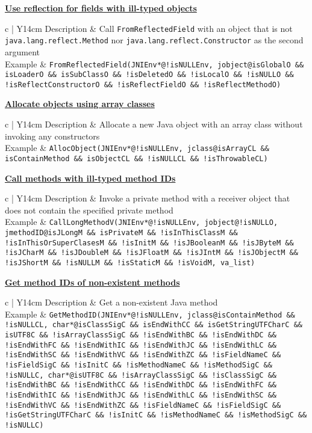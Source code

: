 \documentclass[10pt]{article}
\newcommand{\tc}[1]{\noindent\textbf{\underline{#1}}}
\newcommand{\mytable}[1]{{\renewcommand{\arraystretch}{2.0}
      \begin{tabular}{ c | Y{14cm}} #1
    \end{tabular}}\hfill}
\newcommand{\tctable}[4]{\mytable{#1 & #2 \\\hline #3 & \texttt{#4} \\}}
\begin{document}
\vspace{3mm}
\tc{Use reflection for fields with ill-typed objects}

\tctable
{Description}
{Call {\tt FromReflectedField} with an
object that is not {\tt java.lang.reflect.Method} nor {\tt java.lang.reflect.Constructor}
as the second argument}
{Example}
{FromReflectedField(JNIEnv*@!isNULLEnv, jobject@isGlobalO \&\& isLoaderO \&\& isSubClassO \&\& !isDeletedO \&\& !isLocalO \&\& !isNULLO \&\& !isReflectConstructorO \&\& !isReflectFieldO \&\& !isReflectMethodO)}

\newpage
\tc{Allocate objects using array classes}

\tctable
{Description}
{Allocate a new Java object with an array class without invoking any constructors}
{Example}
{AllocObject(JNIEnv*@!isNULLEnv, jclass@isArrayCL \&\& isContainMethod \&\& isObjectCL \&\& !isNULLCL \&\& !isThrowableCL)}

\vspace{3mm}
\tc{Call methods with ill-typed method IDs}

\tctable
{Description}
{Invoke a private method with a receiver object that does not contain the specified private method}
{Example}
{CallLongMethodV(JNIEnv*@!isNULLEnv, jobject@!isNULLO, jmethodID@isJLongM \&\& isPrivateM \&\& !isInThisClassM \&\& !isInThisOrSuperClasesM \&\& !isInitM \&\& !isJBooleanM \&\& !isJByteM \&\& !isJCharM \&\& !isJDoubleM \&\& !isJFloatM \&\& !isJIntM \&\& !isJObjectM \&\& !isJShortM \&\& !isNULLM \&\& !isStaticM \&\& !isVoidM, va\_list)}

\vspace{3mm}
\tc{Get method IDs of non-existent methods}

\tctable
{Description}
{Get a non-existent Java method}
{Example}
{GetMethodID(JNIEnv*@!isNULLEnv, jclass@isContainMethod \&\& !isNULLCL, char*@isClassSigC \&\& isEndWithCC \&\& isGetStringUTFCharC \&\& isUTF8C \&\& !isArrayClassSigC \&\& !isEndWithBC \&\& !isEndWithDC \&\& !isEndWithFC \&\& !isEndWithIC \&\& !isEndWithJC \&\& !isEndWithLC \&\& !isEndWithSC \&\& !isEndWithVC \&\& !isEndWithZC \&\& !isFieldNameC \&\& !isFieldSigC \&\& !isInitC \&\& !isMethodNameC \&\& !isMethodSigC \&\& !isNULLC, char*@isUTF8C \&\& !isArrayClassSigC \&\& !isClassSigC \&\& !isEndWithBC \&\& !isEndWithCC \&\& !isEndWithDC \&\& !isEndWithFC \&\& !isEndWithIC \&\& !isEndWithJC \&\& !isEndWithLC \&\& !isEndWithSC \&\& !isEndWithVC \&\& !isEndWithZC \&\& !isFieldNameC \&\& !isFieldSigC \&\& !isGetStringUTFCharC \&\& !isInitC \&\& !isMethodNameC \&\& !isMethodSigC \&\& !isNULLC)}
\end{document}
